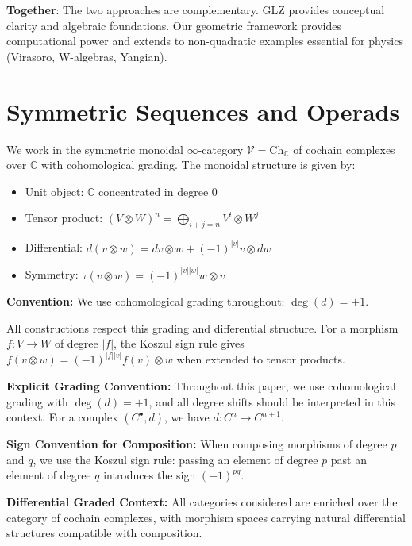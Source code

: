 \begin{example}
\begin{remark}
\textbf{Together}: The two approaches are complementary. GLZ provides conceptual clarity 
and algebraic foundations. Our geometric framework provides computational power and extends 
to non-quadratic examples essential for physics (Virasoro, W-algebras, Yangian).
\end{remark}
 
\section{Symmetric Sequences and Operads}

\begin{definition}
We work in the symmetric monoidal $\infty$-category $\mathcal{V} = \text{Ch}_\mathbb{C}$ of 
cochain complexes over $\mathbb{C}$ with cohomological grading. The monoidal structure is given by:
\begin{itemize}
\item Unit object: $\mathbb{C}$ concentrated in degree 0
\item Tensor product: $(V \otimes W)^n = \bigoplus_{i+j=n} V^i \otimes W^j$
\item Differential: $d(v \otimes w) = dv \otimes w + (-1)^{|v|}v \otimes dw$
\item Symmetry: $\tau(v \otimes w) = (-1)^{|v||w|}w \otimes v$
\end{itemize}
\textbf{Convention:} We use cohomological grading throughout: $\deg(d) = +1$.

All constructions respect this grading and differential structure. For a morphism $f: V \to W$ of degree $|f|$, the Koszul sign rule gives $f(v \otimes w) = (-1)^{|f||v|}f(v) \otimes w$ when extended to tensor products.

\textbf{Explicit Grading Convention:} Throughout this paper, we use cohomological grading with $\deg(d) = +1$, and all degree shifts should be interpreted in this context. For a complex $(C^\bullet, d)$, we have $d: C^n \to C^{n+1}$.

\textbf{Sign Convention for Composition:} When composing morphisms of degree $p$ and $q$, we use the Koszul sign rule: passing an element of degree $p$ past an element of degree $q$ introduces the sign $(-1)^{pq}$.

\textbf{Differential Graded Context:} All categories considered are enriched over the category of cochain complexes, with morphism spaces carrying natural differential structures compatible with composition.


\end{definition}
\end{example}
